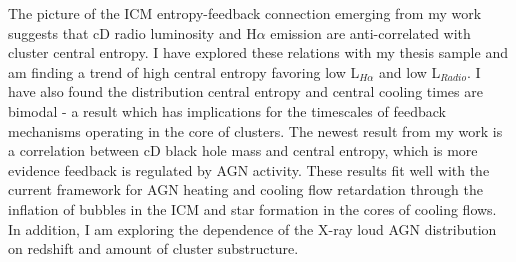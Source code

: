 \documentclass[11pt]{article}
\begin{document}
The picture of the ICM entropy-feedback connection emerging from my
work suggests that cD radio luminosity and H$\alpha$ emission are
anti-correlated with cluster central entropy. I have explored these
relations with my thesis sample and am finding a trend of high central
entropy favoring low L$_{H\alpha}$ and low L$_{Radio}$. I have also
found the distribution central entropy and central cooling times are
bimodal - a result which has implications for the timescales of
feedback mechanisms operating in the core of clusters. The newest
result from my work is a correlation between cD black hole mass
and central entropy, which is more evidence feedback is regulated by
AGN activity. These results fit well with the current framework for
AGN heating and cooling flow retardation through the inflation of
bubbles in the ICM and star formation in the cores of cooling
flows. In addition, I am exploring the dependence of the X-ray loud
AGN distribution on redshift and amount of cluster substructure.
\end{document}
